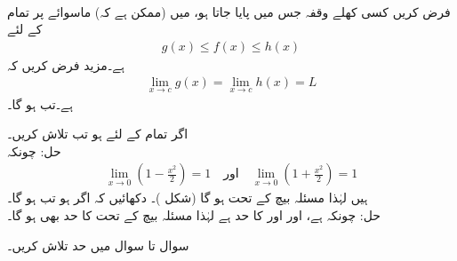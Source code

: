 \\
فرض کریں کسی کھلے وقفہ جس میں  پایا جاتا ہو، میں (ممکن ہے کہ) ماسوائے  پر تمام  کے لئے
\begin{align*}
g(x)\le f(x)\le h(x)
\end{align*}
ہے۔مزید فرض کریں کہ 
\begin{align*}
\lim_{x\to c} g(x)=\lim_{x\to c}h(x)=L
\end{align*}
ہے۔تب  ہو گا۔

اگر تمام  کے لئے  ہو تب  تلاش کریں۔\\
حل:\quad
چونکہ
\begin{align*}
\lim_{x\to 0} (1-\tfrac{x^2}{2})=1\quad \text{اور}\quad \lim_{x\to 0} (1+\tfrac{x^2}{2})=1
\end{align*}
ہیں لہٰذا مسئلہ بیچ کے تحت  ہو گا (شکل )۔
دکھائیں کہ اگر  ہو تب  ہو گا۔\\
حل:\quad
چونکہ  ہے، اور  اور  کا حد  ہے لہٰذا مسئلہ بیچ کے تحت  کا حد بھی  ہو گا۔ 


سوال  تا سوال  میں حد تلاش کریں۔

